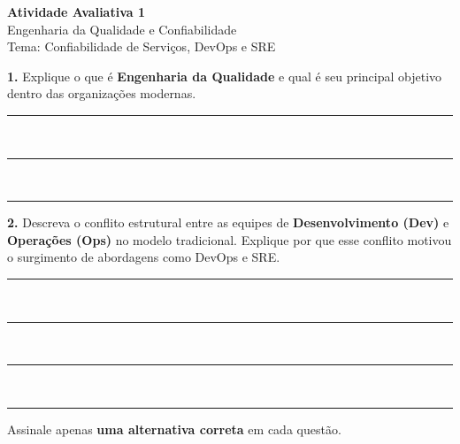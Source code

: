 \documentclass[12pt]{article}
\begin{document}
    
    \vspace*{0.2cm}
    \begin{center}
      {\Large \textbf{Atividade Avaliativa 1}}\\[0.2cm]
      {\large Engenharia da Qualidade e Confiabilidade}\\[0.2cm]
      Tema: Confiabilidade de Serviços, DevOps e SRE
    \end{center}
    
    \vspace{0.5cm}
    
    
    
    
    \textbf{1.} Explique o que é \textbf{Engenharia da Qualidade} e qual é seu principal objetivo dentro das organizações modernas.\\[0.3cm]
    \rule{\textwidth}{0.4pt}\\
    \rule{\textwidth}{0.4pt}\\
    \rule{\textwidth}{0.4pt}
    
    \vspace{0.3cm}
    
    
    
    \textbf{2.} Descreva o conflito estrutural entre as equipes de \textbf{Desenvolvimento (Dev)} e \textbf{Operações (Ops)} no modelo tradicional. Explique por que esse conflito motivou o surgimento de abordagens como DevOps e SRE.\\[0.3cm]
    \rule{\textwidth}{0.4pt}\\
    \rule{\textwidth}{0.4pt}\\
    \rule{\textwidth}{0.4pt}\\
    \rule{\textwidth}{0.4pt}
    
\vspace{2cm}
    
    
    Assinale apenas \textbf{uma alternativa correta} em cada questão.
    
\end{document}
